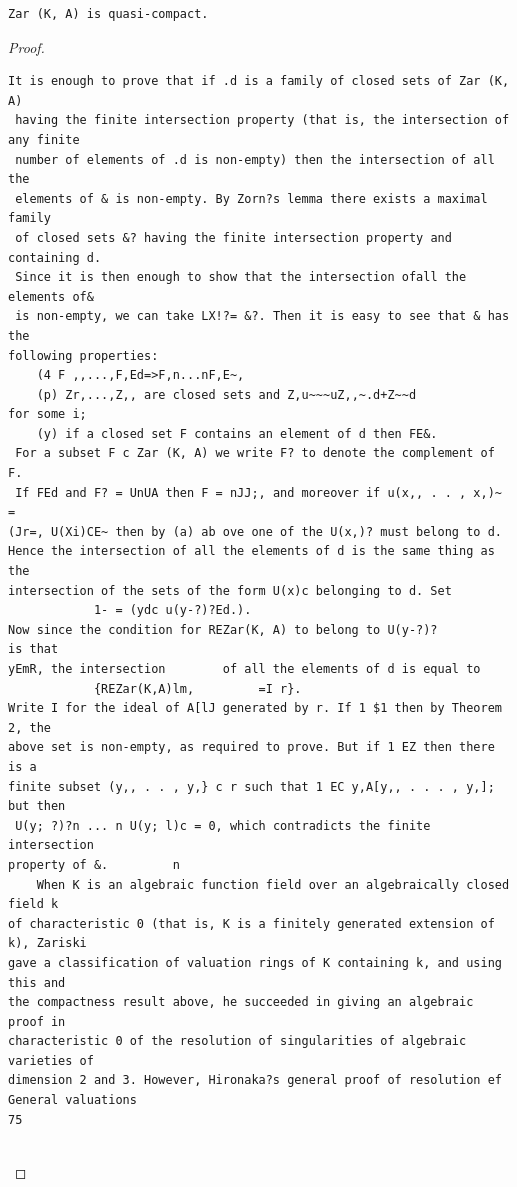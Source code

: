\begin{theorem}\label{mcrt-auto-theorem-10-5}\uses{}
\begin{verbatim}
Zar (K, A) is quasi-compact.
\end{verbatim}
\end{theorem}
\begin{proof}
\begin{verbatim}
It is enough to prove that if .d is a family of closed sets of Zar (K, A)
 having the finite intersection property (that is, the intersection of any finite
 number of elements of .d is non-empty) then the intersection of all the
 elements of & is non-empty. By Zorn?s lemma there exists a maximal family
 of closed sets &? having the finite intersection property and containing d.
 Since it is then enough to show that the intersection ofall the elements of&
 is non-empty, we can take LX!?= &?. Then it is easy to see that & has the
following properties:
    (4 F ,,...,F,Ed=>F,n...nF,E~,
    (p) Zr,...,Z,, are closed sets and Z,u~~~uZ,,~.d+Z~~d                for some i;
    (y) if a closed set F contains an element of d then FE&.
 For a subset F c Zar (K, A) we write F? to denote the complement of F.
 If FEd and F? = UnUA then F = nJJ;, and moreover if u(x,, . . , x,)~ =
(Jr=, U(Xi)CE~ then by (a) ab ove one of the U(x,)? must belong to d.
Hence the intersection of all the elements of d is the same thing as the
intersection of the sets of the form U(x)c belonging to d. Set
            1- = (ydc u(y-?)?Ed.).
Now since the condition for REZar(K, A) to belong to U(y-?)?                   is that
yEmR, the intersection        of all the elements of d is equal to
            {REZar(K,A)lm,         =I r}.
Write I for the ideal of A[lJ generated by r. If 1 $1 then by Theorem 2, the
above set is non-empty, as required to prove. But if 1 EZ then there is a
finite subset (y,, . . , y,} c r such that 1 EC y,A[y,, . . . , y,]; but then
 U(y; ?)?n ... n U(y; l)c = 0, which contradicts the finite intersection
property of &.         n
    When K is an algebraic function field over an algebraically closed field k
of characteristic 0 (that is, K is a finitely generated extension of k), Zariski
gave a classification of valuation rings of K containing k, and using this and
the compactness result above, he succeeded in giving an algebraic proof in
characteristic 0 of the resolution of singularities of algebraic varieties of
dimension 2 and 3. However, Hironaka?s general proof of resolution ef
General valuations                                                    75


\end{verbatim}
\end{proof}
